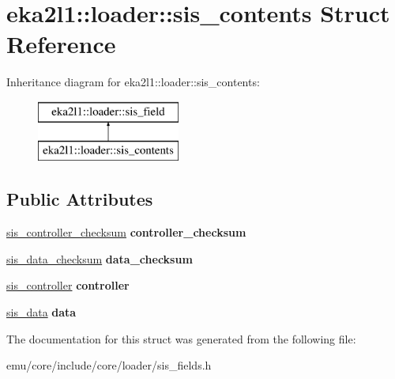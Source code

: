 \hypertarget{structeka2l1_1_1loader_1_1sis__contents}{}\section{eka2l1\+:\+:loader\+:\+:sis\+\_\+contents Struct Reference}
\label{structeka2l1_1_1loader_1_1sis__contents}
Inheritance diagram for eka2l1\+:\+:loader\+:\+:sis\+\_\+contents\+:\begin{figure}[H]
\begin{center}
\leavevmode
\includegraphics[height=2.000000cm]{structeka2l1_1_1loader_1_1sis__contents}
\end{center}
\end{figure}
\subsection*{Public Attributes}
\begin{DoxyCompactItemize}
\item 
\mbox{\label{structeka2l1_1_1loader_1_1sis__contents_a7c5e4d22863b77d456d12fbdcb19f979}} 
\mbox{\hyperlink{structeka2l1_1_1loader_1_1sis__controller__checksum}{sis\+\_\+controller\+\_\+checksum}} {\bfseries controller\+\_\+checksum}
\item 
\mbox{\label{structeka2l1_1_1loader_1_1sis__contents_a466537814e0b6c7a2474cefd84206b37}} 
\mbox{\hyperlink{structeka2l1_1_1loader_1_1sis__data__checksum}{sis\+\_\+data\+\_\+checksum}} {\bfseries data\+\_\+checksum}
\item 
\mbox{\label{structeka2l1_1_1loader_1_1sis__contents_af130183746b2e646112dc80de4fb1aa4}} 
\mbox{\hyperlink{structeka2l1_1_1loader_1_1sis__controller}{sis\+\_\+controller}} {\bfseries controller}
\item 
\mbox{\label{structeka2l1_1_1loader_1_1sis__contents_a2b4df3188c93a349ef1082a79d4dce78}} 
\mbox{\hyperlink{structeka2l1_1_1loader_1_1sis__data}{sis\+\_\+data}} {\bfseries data}
\end{DoxyCompactItemize}


The documentation for this struct was generated from the following file\+:\begin{DoxyCompactItemize}
\item 
emu/core/include/core/loader/sis\+\_\+fields.\+h\end{DoxyCompactItemize}
